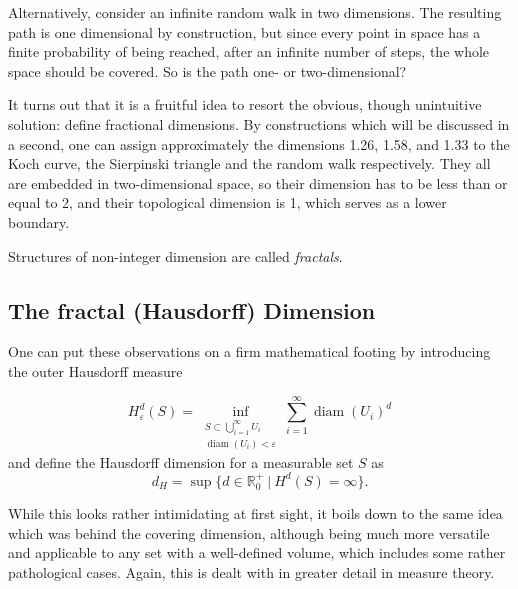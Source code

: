 \documentclass[twocolumn,10pt]{scrartcl}
\begin{document}
            Alternatively, consider an infinite random walk in two dimensions. The resulting path is one dimensional by
            construction, but since every point in space has a finite probability of being reached, after an infinite
            number of steps, the whole space should be covered. So is the path one- or two-dimensional?

            It turns out that it is a fruitful idea to resort the obvious, though unintuitive solution: define
            fractional dimensions. By constructions which will be discussed in a second, one can assign approximately
            the dimensions 1.26, 1.58, and 1.33 to the Koch curve, the Sierpinski triangle and the
            random walk respectively. They all are embedded in two-dimensional space, so their dimension has to be
            less than or equal to 2, and their topological dimension is 1, which serves as a lower boundary.

            Structures of non-integer dimension are called \emph{fractals}.

        \subsection{The fractal (Hausdorff) Dimension}
            One can put these observations on a firm mathematical footing by introducing the outer Hausdorff measure

            \begin{equation*}
                H^d_\varepsilon(S)=
                \inf_{\substack{S \subset\bigcup_{i=1}^\infty U_i\\ \operatorname{diam}(U_i) <
                \varepsilon}}
                    \sum_{i=1}^\infty \operatorname{diam}(U_i)^d
            \end{equation*}
            and define the Hausdorff dimension for a measurable set $S$ as
            \begin{equation*}
                d_H = \sup\{d\in\mathbb{R}^+_0\ |\ H^d(S) = \infty\}.
            \end{equation*}

            While this looks rather intimidating at first sight, it boils down to the same idea which was behind the
            covering dimension, although being much more versatile and applicable to any set with a well-defined
            volume, which includes some rather pathological cases. Again, this is dealt with in greater detail in
            measure theory.
\end{document}
